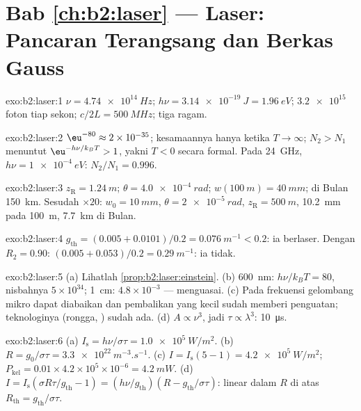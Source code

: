 \section*{Bab \ref{ch:b2:laser} --- Laser: Pancaran Terangsang dan Berkas Gauss}

\begin{solution}{exo:b2:laser:1}
$\nu = \qty{4.74e14}{Hz}$; $h\nu = \qty{3.14e-19}{J} = \qty{1.96}{eV}$;
$\qty{3.2e15}{}$ foton tiap sekon; $c/2L = \qty{500}{MHz}$; tiga
ragam.
\end{solution}

\begin{solution}{exo:b2:laser:2}
$\eu^{-80} \approx 2 \times 10^{-35}$; kesamaannya hanya ketika $T \to \infty$;
$N_2 > N_1$ menuntut $\eu^{-h\nu/k_BT} > 1$, yakni $T < 0$ secara formal. Pada
\qty{24}{GHz}, $h\nu = \qty{1e-4}{eV}$: $N_2/N_1 = 0.996$.
\end{solution}

\begin{solution}{exo:b2:laser:3}
$z_{\text{R}} = \qty{1.24}{m}$; $\theta = \qty{4.0e-4}{rad}$; $w(\qty{100}{m}) =
\qty{40}{mm}$; di Bulan \qty{150}{km}. Sesudah $\times 20$: $w_0 = \qty{10}{mm}$,
$\theta = \qty{2e-5}{rad}$, $z_{\text{R}} = \qty{500}{m}$, \qty{10.2}{mm} pada
\qty{100}{m}, \qty{7.7}{km} di Bulan.
\end{solution}

\begin{solution}{exo:b2:laser:4}
$g_{\text{th}} = (0.005 + 0.0101)/0.2 = \qty{0.076}{m^{-1}} < 0.2$: ia
berlaser. Dengan $R_2 = 0.90$: $(0.005 + 0.053)/0.2 = \qty{0.29}{m^{-1}}$: ia
tidak.
\end{solution}

\begin{solution}{exo:b2:laser:5}
(a) Lihatlah \cref{prop:b2:laser:einstein}. (b) \qty{600}{nm}: $h\nu/k_BT
= 80$, nisbahnya $5 \times 10^{34}$; \qty{1}{cm}: $4.8 \times 10^{-3}$ ---
 menguasai. (c) Pada frekuensi gelombang mikro
 dapat diabaikan dan pembalikan yang kecil sudah memberi
penguatan; teknologinya (rongga, ) sudah ada. (d) $A \propto
\nu^3$, jadi $\tau \propto \lambda^3$: \qty{10}{\micro s}.
\end{solution}

\begin{solution}{exo:b2:laser:6}
(a) $I_{\text{s}} = h\nu/\sigma\tau = \qty{1.0e5}{W/m^2}$. (b) $R =
g_0/\sigma\tau = \qty{3.3e22}{m^{-3}.s^{-1}}$. (c) $I = I_{\text{s}}(5 - 1) =
\qty{4.2e5}{W/m^2}$; $P_{\text{kel}} = 0.01 \times 4.2 \times 10^5 \times
10^{-6} = \qty{4.2}{mW}$. (d) $I = I_{\text{s}}(\sigma R\tau/g_{\text{th}}
- 1) = (h\nu/g_{\text{th}})(R - g_{\text{th}}/\sigma\tau)$: linear dalam $R$
di atas $R_{\text{th}} = g_{\text{th}}/\sigma\tau$.
\end{solution}

